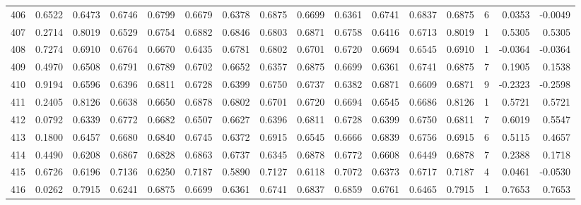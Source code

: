 \begin{tabular}{lrrrrrrrrrrrrrrr}
406 &      0.6522 &  0.6473 &  0.6746 &  0.6799 &  0.6679 &  0.6378 &  0.6875 &  0.6699 &  0.6361 &  0.6741 &   0.6837 &     0.6875 &      6 &                    0.0353 &                    -0.0049 \\
407 &      0.2714 &  0.8019 &  0.6529 &  0.6754 &  0.6882 &  0.6846 &  0.6803 &  0.6871 &  0.6758 &  0.6416 &   0.6713 &     0.8019 &      1 &                    0.5305 &                     0.5305 \\
408 &      0.7274 &  0.6910 &  0.6764 &  0.6670 &  0.6435 &  0.6781 &  0.6802 &  0.6701 &  0.6720 &  0.6694 &   0.6545 &     0.6910 &      1 &                   -0.0364 &                    -0.0364 \\
409 &      0.4970 &  0.6508 &  0.6791 &  0.6789 &  0.6702 &  0.6652 &  0.6357 &  0.6875 &  0.6699 &  0.6361 &   0.6741 &     0.6875 &      7 &                    0.1905 &                     0.1538 \\
410 &      0.9194 &  0.6596 &  0.6396 &  0.6811 &  0.6728 &  0.6399 &  0.6750 &  0.6737 &  0.6382 &  0.6871 &   0.6609 &     0.6871 &      9 &                   -0.2323 &                    -0.2598 \\
411 &      0.2405 &  0.8126 &  0.6638 &  0.6650 &  0.6878 &  0.6802 &  0.6701 &  0.6720 &  0.6694 &  0.6545 &   0.6686 &     0.8126 &      1 &                    0.5721 &                     0.5721 \\
412 &      0.0792 &  0.6339 &  0.6772 &  0.6682 &  0.6507 &  0.6627 &  0.6396 &  0.6811 &  0.6728 &  0.6399 &   0.6750 &     0.6811 &      7 &                    0.6019 &                     0.5547 \\
413 &      0.1800 &  0.6457 &  0.6680 &  0.6840 &  0.6745 &  0.6372 &  0.6915 &  0.6545 &  0.6666 &  0.6839 &   0.6756 &     0.6915 &      6 &                    0.5115 &                     0.4657 \\
414 &      0.4490 &  0.6208 &  0.6867 &  0.6828 &  0.6863 &  0.6737 &  0.6345 &  0.6878 &  0.6772 &  0.6608 &   0.6449 &     0.6878 &      7 &                    0.2388 &                     0.1718 \\
415 &      0.6726 &  0.6196 &  0.7136 &  0.6250 &  0.7187 &  0.5890 &  0.7127 &  0.6118 &  0.7072 &  0.6373 &   0.6717 &     0.7187 &      4 &                    0.0461 &                    -0.0530 \\
416 &      0.0262 &  0.7915 &  0.6241 &  0.6875 &  0.6699 &  0.6361 &  0.6741 &  0.6837 &  0.6859 &  0.6761 &   0.6465 &     0.7915 &      1 &                    0.7653 &                     0.7653 \\

\end{tabular}
